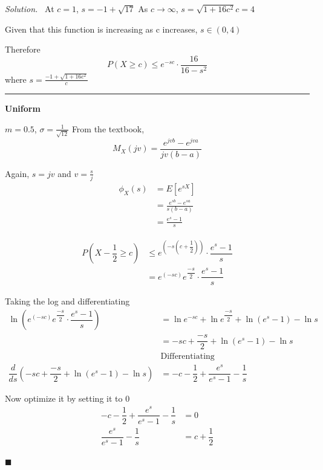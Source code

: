 \documentclass[11pt]{article}
\newenvironment{solution}
{\par\medskip\noindent\textit{Solution.}\ }
{\hfill$\blacksquare$\par\medskip}
\begin{document}
\begin{solution}
        At $c = 1$, $s = - 1 + \sqrt{17}$
        As $c \to \infty$, $s = \sqrt{1 + 16c^2}{c} = 4$

        Given that this function is increasing as c increases, $s \in (0, 4)$

        Therefore
        \[
            P(X \geq c) \leq e^{-sc} \cdot \dfrac{16}{16 - s^2}
        \]
        where $s = \frac{- 1 + \sqrt{1 + 16c^2}}{c}$

        \hrule
        \vspace{1em}

        \textbf{Uniform}

        $m = 0.5$, $\sigma = \frac{1}{\sqrt{12}}$
        From the textbook,
        \[
            M_X(jv) = \frac{e^{jvb} - e^{jva}}{jv(b - a)}
        \]

        Again, $s = jv$ and $v = \frac{s}{j}$
        \begin{align*}
            \phi_X(s) &= E[e^{sX}] \\
            &= \frac{e^{sb} - e^{sa}}{s(b - a)} \\
            &= \frac{e^{s} - 1}{s}
        \end{align*}

        \begin{align*}
            P(X - \dfrac{1}{2} \geq c) &\leq e^{(-s(c + \dfrac{1}{2}))} \cdot \dfrac{e^s - 1}{s} \\
            &= e^{(-sc)}e^{\dfrac{-s}{2}} \cdot \dfrac{e^s - 1}{s}
        \end{align*}

        Taking the log and differentiating
        \begin{align*}
            \ln{\left(e^{(-sc)}e^{\dfrac{-s}{2}} \cdot \dfrac{e^s - 1}{s}\right)} &= \ln{e^{-sc}} + \ln{e^{\dfrac{-s}{2}}} + \ln{(e^s - 1)} - \ln{s} \\
            &= -sc + \dfrac{-s}{2} + \ln{(e^s - 1)} - \ln{s} \\
            & \text{Differentiating} \\
            \dfrac{d}{ds} (-sc + \dfrac{-s}{2} + \ln{(e^s - 1)} - \ln{s}) &= -c - \dfrac{1}{2} + \dfrac{e^s}{e^s - 1} - \dfrac{1}{s}
        \end{align*}

        Now optimize it by setting it to $0$
        \begin{align*}
            -c - \dfrac{1}{2} + \dfrac{e^s}{e^s - 1} - \dfrac{1}{s} &= 0 \\
            \dfrac{e^s}{e^s - 1} - \dfrac{1}{s} &= c + \dfrac{1}{2}
        \end{align*}


\end{solution}
\end{document}
